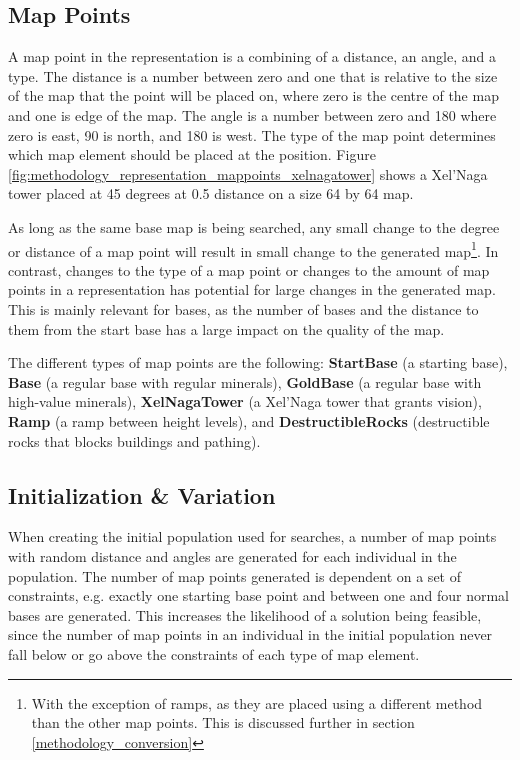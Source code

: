 
\subsection{Map Points}
\label{methodology_representation_mappoints}
A map point in the representation is a combining of a distance, an angle, and a type. The distance is a number between zero and one that is relative to the size of the map that the point will be placed on, where zero is the centre of the map and one is edge of the map. The angle is a number between zero and 180 where zero is east, 90 is north, and 180 is west. The type of the map point determines which map element should be placed at the position. Figure \ref{fig:methodology_representation_mappoints_xelnagatower} shows a Xel'Naga tower placed at 45 degrees at 0.5 distance on a size 64 by 64 map.


As long as the same base map is being searched, any small change to the degree or distance of a map point will result in small change to the generated map\footnote{With the exception of ramps, as they are placed using a different method than the other map points. This is discussed further in section \ref{methodology_conversion}}. In contrast, changes to the type of a map point or changes to the amount of map points in a representation has potential for large changes in the generated map. This is mainly relevant for bases, as the number of bases and the distance to them from the start base has a large impact on the quality of the map.

The different types of map points are the following: \textbf{StartBase} (a starting base), \textbf{Base} (a regular base with regular minerals), \textbf{GoldBase} (a regular base with high-value minerals), \textbf{XelNagaTower} (a Xel'Naga tower that grants vision), \textbf{Ramp} (a ramp between height levels), and \textbf{DestructibleRocks} (destructible rocks that blocks buildings and pathing).

\subsection{Initialization \& Variation}
\label{methodology_representation_initialization}
When creating the initial population used for searches, a number of map points with random distance and angles are generated for each individual in the population. The number of map points generated is dependent on a set of constraints, e.g. exactly one starting base point and between one and four normal bases are generated. This increases the likelihood of a solution being feasible, since the number of map points in an individual in the initial population never fall below or go above the constraints of each type of map element.

